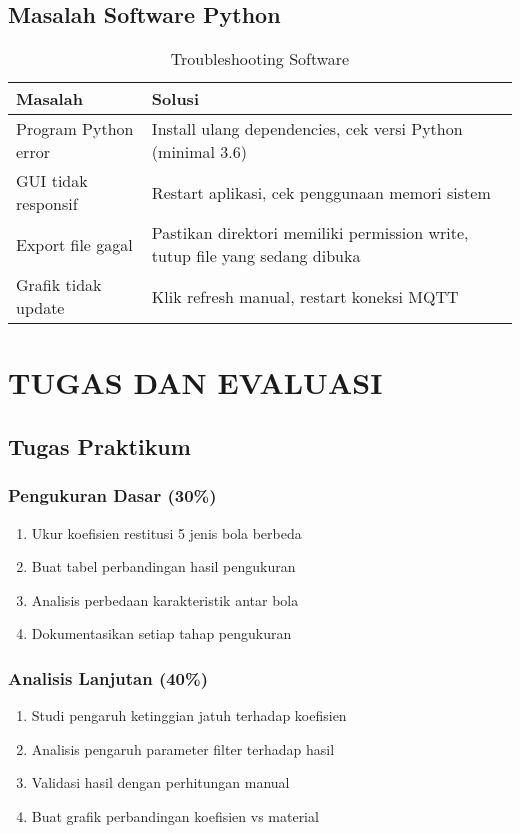 \documentclass[12pt,a4paper]{article}
\begin{document}
\subsection{Masalah Software Python}
\begin{table}[H]
\centering
\begin{tabular}{|p{5cm}|p{8cm}|}
\hline
\textbf{Masalah} & \textbf{Solusi} \\
\hline
Program Python error & Install ulang dependencies, cek versi Python (minimal 3.6) \\
\hline
GUI tidak responsif & Restart aplikasi, cek penggunaan memori sistem \\
\hline
Export file gagal & Pastikan direktori memiliki permission write, tutup file yang sedang dibuka \\
\hline
Grafik tidak update & Klik refresh manual, restart koneksi MQTT \\
\hline
\end{tabular}
\caption{Troubleshooting Software}
\end{table}

\section{TUGAS DAN EVALUASI}

\subsection{Tugas Praktikum}

\subsubsection{Pengukuran Dasar (30\%)}
\begin{enumerate}
    \item Ukur koefisien restitusi 5 jenis bola berbeda
    \item Buat tabel perbandingan hasil pengukuran
    \item Analisis perbedaan karakteristik antar bola
    \item Dokumentasikan setiap tahap pengukuran
\end{enumerate}

\subsubsection{Analisis Lanjutan (40\%)}
\begin{enumerate}
    \item Studi pengaruh ketinggian jatuh terhadap koefisien
    \item Analisis pengaruh parameter filter terhadap hasil
    \item Validasi hasil dengan perhitungan manual
    \item Buat grafik perbandingan koefisien vs material
\end{enumerate}
\end{document}
